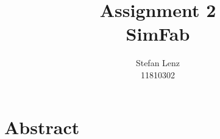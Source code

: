 \documentclass[12pt,a4paper]{article}
\title{Assignment 2\\SimFab}
\author{Stefan Lenz\\11810302}
\date{}
\begin{document}
\maketitle
\newpage
\tableofcontents
\newpage
\section{Abstract}
\end{document}
